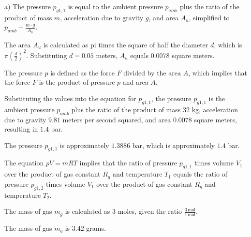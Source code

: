 a) The pressure \( p_{g1,1} \) is equal to the ambient pressure \( p_{amb} \) plus the ratio of the product of mass \( m \), acceleration due to gravity \( g \), and area \( A_u \), simplified to \( p_{amb} + \frac{m \cdot g}{A_u} \).

The area \( A_u \) is calculated as pi times the square of half the diameter \( d \), which is \( \pi \left(\frac{d}{2}\right)^2 \). Substituting \( d = 0.05 \) meters, \( A_u \) equals \( 0.0078 \) square meters.

The pressure \( p \) is defined as the force \( F \) divided by the area \( A \), which implies that the force \( F \) is the product of pressure \( p \) and area \( A \).

Substituting the values into the equation for \( p_{g1,1} \), the pressure \( p_{g1,1} \) is the ambient pressure \( p_{amb} \) plus the ratio of the product of mass \( 32 \) kg, acceleration due to gravity \( 9.81 \) meters per second squared, and area \( 0.0078 \) square meters, resulting in \( 1.4 \) bar.

The pressure \( p_{g1,1} \) is approximately \( 1.3886 \) bar, which is approximately \( 1.4 \) bar.

The equation \( pV = mRT \) implies that the ratio of pressure \( p_{g1,1} \) times volume \( V_1 \) over the product of gas constant \( R_g \) and temperature \( T_1 \) equals the ratio of pressure \( p_{g1,2} \) times volume \( V_1 \) over the product of gas constant \( R_g \) and temperature \( T_2 \).

The mass of gas \( m_g \) is calculated as \( 3 \) moles, given the ratio \( \frac{3 \, \text{mol}}{1 \, \text{mol}} \).

The mass of gas \( m_g \) is \( 3.42 \) grams.